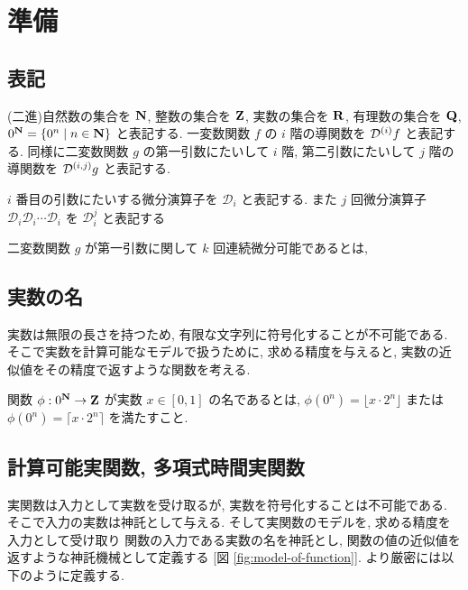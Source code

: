 \section{準備}


\subsection{表記}
(二進)自然数の集合を $\mathbf N$, 整数の集合を $\mathbf Z$, 実数の集合を $\mathbf R$, 
有理数の集合を $\mathbf Q$, $0^\mathbf N = \{0^n \mid n \in \mathbf N\}$ と表記する. 
一変数関数 $f$ の $i$ 階の導関数を $\mathcal D^{(i)}f$ と表記する.
同様に二変数関数 $g$ の第一引数にたいして $i$ 階, 第二引数にたいして $j$ 階の導関数を $\mathcal D^{(i,j)}g$ と表記する. 

$i$ 番目の引数にたいする微分演算子を $\mathcal D_i$ と表記する.
また $j$ 回微分演算子 $\mathcal D_i \mathcal D_i \cdots \mathcal D_i$ を
$\mathcal D^j_i$ と表記する

二変数関数 $g$ が第一引数に関して $k$ 回連続微分可能であるとは,




\subsection{実数の名}
 実数は無限の長さを持つため, 有限な文字列に符号化することが不可能である.
 そこで実数を計算可能なモデルで扱うために, 
 求める精度を与えると, 実数の近似値をその精度で返すような関数を考える.

\begin{definition}[実数の名]
 関数 $\phi : 0^\mathbf N \to \mathbf Z $ が実数 $x \in [0,1]$ の名であるとは,
 $\phi(0^n) = \lfloor x \cdot 2^n \rfloor$ または
 $\phi(0^n) = \lceil x \cdot 2^n \rceil$ を満たすこと.
\end{definition}

\subsection{計算可能実関数, 多項式時間実関数}
 実関数は入力として実数を受け取るが, 実数を符号化することは不可能である.
 そこで入力の実数は神託として与える.
 そして実関数のモデルを, 求める精度を入力として受け取り
 関数の入力である実数の名を神託とし, 関数の値の近似値を返すような神託機械として定義する
 [図 \ref{fig:model-of-function}].
 より厳密には以下のように定義する.

